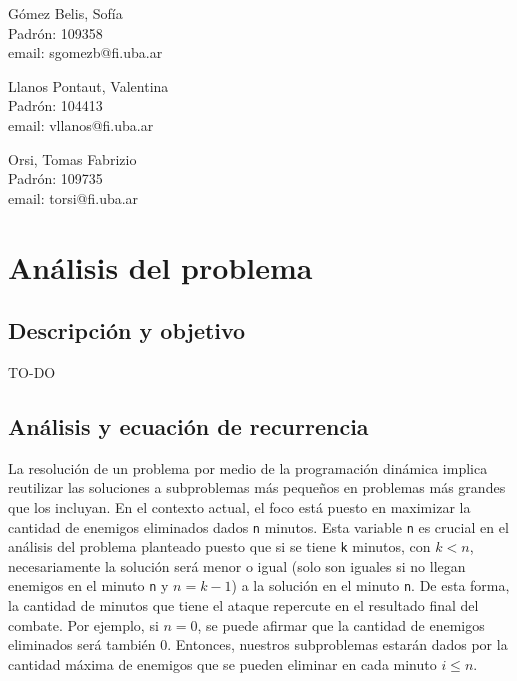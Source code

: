 \documentclass{article}
\begin{document}
\begin{titlepage}
\begin{center}
    {\begin{minipage}[t]{.32\textwidth}
        \begin{center}
          Gómez Belis, Sofía\\
          {\small{Padrón: 109358}}\\
          {\small{email: sgomezb@fi.uba.ar}}
        \end{center}
          \end{minipage}
          \begin{minipage}[t]{.32\textwidth}
        \begin{center}
          Llanos Pontaut, Valentina\\
          {\small{Padrón: 104413}}\\
          {\small{email: vllanos@fi.uba.ar}}\\
        \end{center}
      \end{minipage}
      \begin{minipage}[t]{.32\textwidth}
        \begin{center}
          Orsi, Tomas Fabrizio\\
          {\small{Padrón: 109735}}\\
          {\small{email: torsi@fi.uba.ar}}
        \end{center}
      \end{minipage}}

  \end{center}
\end{titlepage}

\renewcommand*\contentsname{Indice}
\tableofcontents
\pagebreak

\section{Análisis del problema}
\subsection{Descripción y objetivo}
TO-DO
\subsection{Análisis y ecuación de recurrencia}

La resolución de un problema por medio de la programación dinámica implica reutilizar las soluciones a subproblemas más pequeños en problemas más grandes que los incluyan. En el contexto actual, el foco está puesto en maximizar la cantidad de enemigos eliminados dados \texttt{n} minutos. Esta variable \texttt{n} es crucial en el análisis del problema planteado puesto que si se tiene \texttt{k} minutos, con $k < n$, necesariamente la solución será menor o igual (solo son iguales si no llegan enemigos en el minuto \texttt{n} y $n = k - 1$) a la solución en el minuto \texttt{n}. De esta forma, la cantidad de minutos que tiene el ataque repercute en el resultado final del combate. Por ejemplo, si $n = 0$, se puede afirmar que la cantidad de enemigos eliminados será también 0. Entonces, nuestros subproblemas estarán dados por la cantidad máxima de enemigos que se pueden eliminar en cada minuto $i \leq n$.
\end{document}
